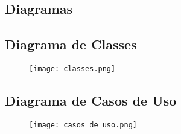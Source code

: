 \begin{landscape}
\section{Diagramas}\label{diagramas}

\subsection{Diagrama de Classes}
\begin{figure}[H]
	\centering
	\texttt{[image: classes.png]}
\end{figure}

%

\subsection{Diagrama de Casos de Uso}
\begin{figure}[H]
	\centering
	\texttt{[image: casos\_de\_uso.png]}
\end{figure}
\end{landscape}
